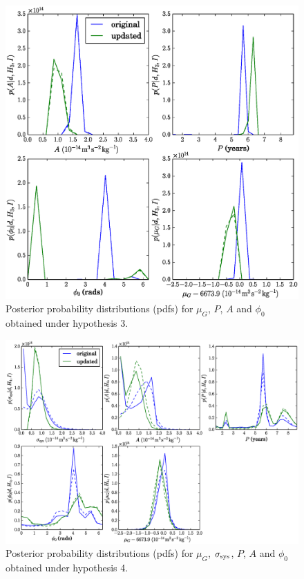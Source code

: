 \documentclass[page-classic]{epl2}
\begin{document}
\begin{figure}
 \centerline{\includegraphics[width=1.0\textwidth]{hypothesis3}}
 \caption{Posterior probability distributions (pdfs) for $\mu_G$, $P$, $A$ and $\phi_0$ obtained under hypothesis 3.}
 \label{fig:h3}
\end{figure}

\begin{figure}
 \centerline{\includegraphics[width=1.0\textwidth]{hypothesis4}}
 \caption{Posterior probability distributions (pdfs) for $\mu_G$, $\sigma_{\rm sys}$, $P$, $A$ and $\phi_0$ obtained under hypothesis 4.}
 \label{fig:h4}
\end{figure}
\end{document}
